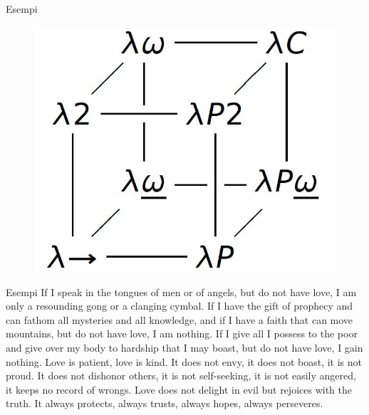 \documentclass{beamer}
\subtitle{Parte 1: Le basi}
\begin{document}
\begin{frame}
\titlepage
\end{frame}

\begin{frame}{Esempi}
\begin{figure}
\includegraphics[height=0.7\textheight]{esempio1}
\end{figure}
\end{frame}

\begin{frame}{Esempi}
\shapepar{\heartshape}
If I speak in the tongues of men or of angels, but do not have love, I am only a resounding gong or a clanging cymbal. If I have the gift of prophecy and can fathom all mysteries and all knowledge, and if I have a faith that can move mountains, but do not have love, I am nothing.  If I give all I possess to the poor and give over my body to hardship that I may boast, but do not have love, I gain nothing. Love is patient, love is kind. It does not envy, it does not boast, it is not proud.  It does not dishonor others, it is not self-seeking, it is not easily angered, it keeps no record of wrongs.  Love does not delight in evil but rejoices with the truth. It always protects, always trusts, always hopes, always perseveres.
\end{frame}
\end{document}
